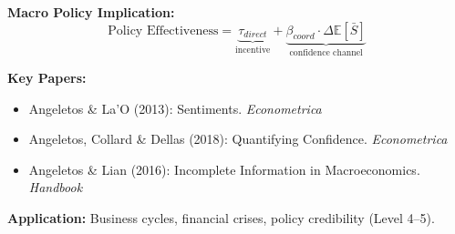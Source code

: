 \begin{tcolorbox}[colback=green!5!white, colframe=green!75!black,
    title=Theorem BCJ-T33: Angeletos Coordination \& Sentiment as Special Case]
\textbf{Macro Policy Implication:}
\begin{equation}
\text{Policy Effectiveness} = \underbrace{\tau_{direct}}_{\text{incentive}} + \underbrace{\beta_{coord} \cdot \Delta\mathbb{E}[\bar{S}]}_{\text{confidence channel}}
\end{equation}

\textbf{Key Papers:}
\begin{itemize}[nosep]
\item Angeletos \& La'O (2013): Sentiments. \textit{Econometrica}
\item Angeletos, Collard \& Dellas (2018): Quantifying Confidence. \textit{Econometrica}
\item Angeletos \& Lian (2016): Incomplete Information in Macroeconomics. \textit{Handbook}
\end{itemize}

\textbf{Application:} Business cycles, financial crises, policy credibility (Level 4--5).
\end{tcolorbox}


